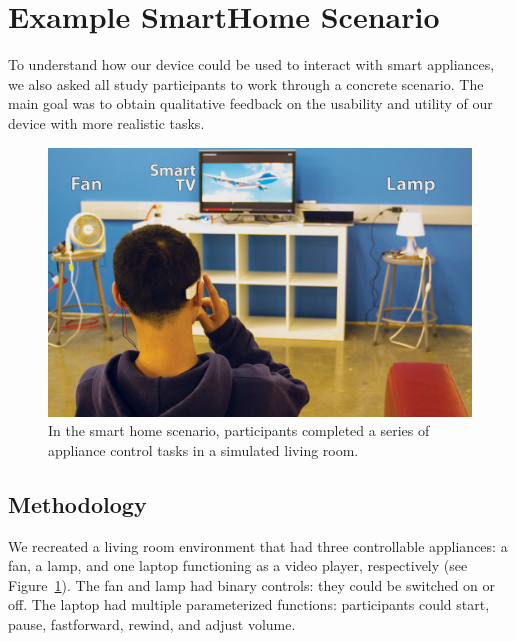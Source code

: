 \section{Example SmartHome Scenario}
To understand how our device could be used to interact with smart appliances, we also asked all study participants to work through a concrete scenario. The main goal was to obtain qualitative feedback on the usability and utility of our device with more realistic tasks.

\begin{figure}[t]
\centering
\includegraphics[width=1.0\columnwidth]{figures/smarthome-scenario-bh.jpg}
\caption{In the smart home scenario, participants completed a series of appliance control tasks in a simulated living room.}
\label{fig:smarthome}
\end{figure}

\subsection{Methodology}
We recreated a living room environment that had three controllable appliances: a fan, a lamp, and one laptop functioning as a video player, respectively (see Figure~\ref{fig:smarthome}). The fan and lamp had binary controls: they could be switched on or off. The laptop had multiple parameterized functions: participants could start, pause, fastforward, rewind, and adjust volume.

